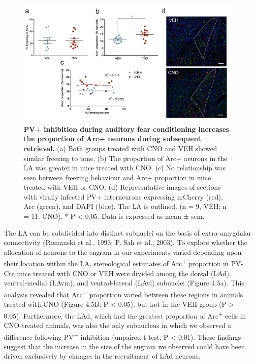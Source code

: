 \documentclass[12pt,a4paper,]{report}
\begin{document}
\begin{figure}[htbp]
\centering
\includegraphics{source/figures/figure_4.jpg}
\caption{\textbf{PV+ inhibition during auditory fear conditioning
increases the proportion of Arc+ neurons during subsequent retrieval.}
(a) Both groups treated with CNO and VEH showed similar freezing to
tone. (b) The proportion of Arc+ neurons in the LA was greater in mice
treated with CNO. (c) No relationship was seen between freezing
behaviour and Arc+ proportion in mice treated with VEH or CNO. (d)
Representative images of sections with virally infected PV+ interneurons
expressing mCherry (red), Arc (green), and DAPI (blue). The LA is
outlined. (n = 9, VEH; n = 11, CNO). * P \textless{} 0.05. Data is
expressed as mean ± sem. \label{ref_a_figure}}
\end{figure}

The LA can be subdivided into distinct subnuclei on the basis of
extra-amygdalar connectivity (Romanski et al., 1993; P. Sah et al.,
2003). To explore whether the allocation of neurons to the engram in our
experiments varied depending upon their location within the LA,
stereological estimates of Arc\textsuperscript{+} proportion in PV-Cre
mice treated with CNO or VEH were divided among the dorsal (LAd),
ventral-medial (LAvm), and ventral-lateral (LAvl) subnuclei (Figure
4.5a). This analysis revealed that Arc\textsuperscript{+} proportion
varied between these regions in animals treated with CNO (Figure 4.5B; P
\textless{} 0.05), but not in the VEH group (P \textgreater{} 0.05).
Furthermore, the LAd, which had the greatest proportion of
Arc\textsuperscript{+} cells in CNO-treated animals, was also the only
subnucleus in which we observed a difference following
PV\textsuperscript{+} inhibition (unpaired t test, P \textless{} 0.01).
These findings suggest that the increase in the size of the engram we
observed could have been driven exclusively by changes in the
recruitment of LAd neurons.
\end{document}
